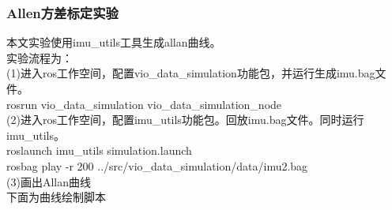 \documentclass[UTF8]{ctexart}
\begin{document}
\subsubsection{Allen方差标定实验}
\indent 本文实验使用imu\_utils工具生成allan曲线。\\
\indent 实验流程为：\\
\indent (1)进入ros工作空间，配置vio\_data\_simulation功能包，并运行生成imu.bag文件。\\
\indent\indent rosrun vio\_data\_simulation vio\_data\_simulation\_node\\
\indent (2)进入ros工作空间，配置imu\_utils功能包。回放imu.bag文件。同时运行imu\_utils。\\
\indent\indent roslaunch imu\_utils simulation.launch\\
\indent\indent rosbag play -r 200 ../src/vio\_data\_simulation/data/imu2.bag\\
\indent (3)画出Allan曲线\\
\indent 下面为曲线绘制脚本\\
\end{document}
